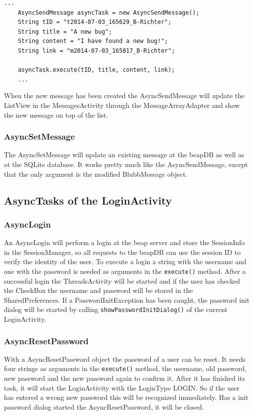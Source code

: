 \documentclass[12pt,a4paper,oneside]{report}
\newcommand{\beapDB}{beapDB}
\newcommand{\beapServer}{beap server}
\newcommand{\code}[1]{\lstinline{#1}}
\begin{document}
\begin{lstlisting}[caption=AsyncSendMessage example, label=lst:AsyncSendMsg]
	...
	AsyncSendMessage asyncTask = new AsyncSendMessage();
	String tID = "t2014-07-03_165629_B-Richter";
	String title = "A new bug";
	String content = "I have found a new bug!";
	String link = "m2014-07-03_165817_B-Richter";
	
	asyncTask.execute(tID, title, content, link);	
	...
\end{lstlisting}

When the new message has been created the AsyncSendMessage will update the ListView in the MessagesActivity through the MessageArrayAdapter and show the new message on top of the list.

\subsubsection{AsyncSetMessage}
The AsyncSetMessage will update an existing message at the \beapDB{} as well as at the SQLite database. It works pretty much like the AsyncSendMessage, except that the only argument is the modified BlubbMessage object. 

\subsection{AsyncTasks of the LoginActivity}\label{subsec:AsyncLogin}
\subsubsection{AsyncLogin}
An AsyncLogin will perform a login at the \beapServer{} and store the SessionInfo in the SessionManager, so all requests to the \beapDB{} can use the session ID to verify the identity of the user. To execute a login a string with the username and one with the password is needed as arguments in the \code{execute()} method.
After a successful login the ThreadsActivity will be started and if the user has checked the CheckBox the username and password will be stored in the SharedPreferences. If a PasswordInitException has been caught, the password init dialog will be started by calling \code{showPasswordInitDialog()} of the current LoginActivity. 

\subsubsection{AsyncResetPassword}
With a AsyncResetPassword object the password of a user can be reset. It needs four strings as arguments in the \code{execute()} method, the username, old password, new password and the new password again to confirm it. After it has finished its task, it will start the LoginActivity with the LoginType LOGIN. So if the user has entered a wrong new password this will be recognized immediately. Has a init password dialog started the AsyncResetPassword, it will be closed.
\end{document}
